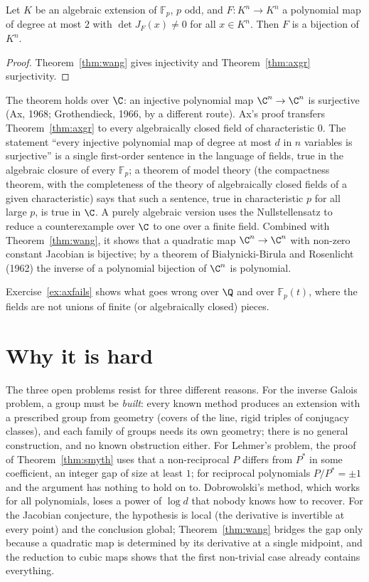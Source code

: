 \begin{corollary}\label{cor:wangfin}
Let $K$ be an algebraic extension of $\mathbb F_p$, $p$ odd, and $F:K^n\to K^n$ a polynomial map of degree at most $2$ with $\det J_F(x)\ne0$ for all $x\in K^n$.
Then $F$ is a bijection of $K^n$.
\end{corollary}
\begin{proof}
Theorem~\ref{thm:wang} gives injectivity and Theorem~\ref{thm:axgr} surjectivity.
\end{proof}

\begin{remark}\label{rem:axC}
The theorem holds over $\C$: an injective polynomial map $\C^n\to\C^n$ is surjective (Ax, 1968; Grothendieck, 1966, by a different route). Ax's proof
transfers Theorem~\ref{thm:axgr} to every algebraically closed field of characteristic $0$. The statement ``every injective polynomial map of degree at most
$d$ in $n$ variables is surjective'' is a single first-order sentence in the language of fields, true in the algebraic closure of every $\mathbb F_p$; a theorem
of model theory (the compactness theorem, with the completeness of the theory of algebraically closed fields of a given characteristic) says that such a
sentence, true in characteristic $p$ for all large $p$, is true in $\C$. A purely algebraic version uses the Nullstellensatz to reduce a counterexample
over $\C$ to one over a finite field. Combined with Theorem~\ref{thm:wang}, it shows that a quadratic map $\C^n\to\C^n$ with non-zero constant
Jacobian is bijective; by a theorem of Bia\l ynicki-Birula and Rosenlicht (1962) the inverse of a polynomial bijection of $\C^n$ is polynomial.
\end{remark}

Exercise~\ref{ex:axfails} shows what goes wrong over $\Q$ and over $\mathbb F_p(t)$, where the fields are not unions of finite (or algebraically closed)
pieces.

\section{Why it is hard}

The three open problems resist for three different reasons. For the inverse Galois problem, a group must be \emph{built}: every known method produces an
extension with a prescribed group from geometry (covers of the line, rigid triples of conjugacy classes), and each family of groups needs its own geometry;
there is no general construction, and no known obstruction either. For Lehmer's problem, the proof of Theorem~\ref{thm:smyth} uses that a non-reciprocal
$P$ differs from $P^*$ in some coefficient, an integer gap of size at least $1$; for reciprocal polynomials $P/P^*=\pm1$ and the argument has nothing to hold
on to. Dobrowolski's method, which works for all polynomials, loses a power of $\log d$ that nobody knows how to recover. For the Jacobian conjecture, the
hypothesis is local (the derivative is invertible at every point) and the conclusion global; Theorem~\ref{thm:wang} bridges the gap only because a quadratic
map is determined by its derivative at a single midpoint, and the reduction to cubic maps shows that the first non-trivial case already contains everything.


